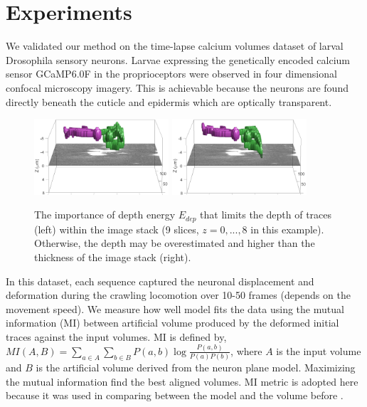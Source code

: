 \documentclass{article}
\begin{document}
\section{Experiments}
We validated our method on the time-lapse calcium volumes dataset of larval Drosophila sensory neurons. Larvae expressing the genetically encoded calcium sensor GCaMP6.0F in the proprioceptors were observed in four dimensional confocal microscopy imagery. This is achievable because the neurons are found directly beneath the cuticle and epidermis which are optically transparent.

\begin{figure}[b]
	\centering
	\vspace{-10pt}
	\includegraphics[height=80pt, width=0.45\linewidth]{img/norm2}
	\includegraphics[height=80pt, width=0.45\linewidth]{img/dep2}
	\vspace{-10pt}
	\caption{\small{The importance of depth energy $E_{dep}$ that limits the depth of traces (left) within the image stack (9 slices, $z=0,...,8$ in this example). Otherwise, the depth may be overestimated and higher than the thickness of the image stack (right).}}
	\vspace{-10pt}
	\label{fig:Edep}
\end{figure}

In this dataset, each sequence captured the neuronal displacement and deformation during the crawling locomotion over 10-50 frames (depends on the movement speed). We measure how well model fits the data using the mutual information (MI) \cite{Viola1997} between artificial volume produced by the deformed initial traces against the input volumes. MI is defined by, $MI(A,B) = \sum_{a \in A}\sum_{b \in B} P(a,b) \log \frac{P(a,b)}{P(a)P(b)}$, where $A$ is the input volume and $B$ is the artificial volume derived from the neuron plane model. Maximizing the mutual information find the best aligned volumes. MI metric is adopted here because it was used in comparing between the model and the volume before \cite{Viola1997}.
\end{document}
